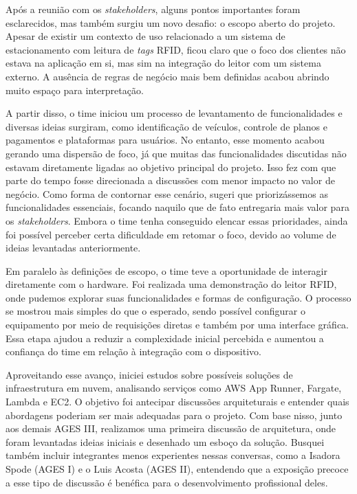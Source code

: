 \indent Após a reunião com os \textit{stakeholders}, alguns pontos importantes foram esclarecidos, mas também surgiu um novo desafio: o escopo aberto do projeto. Apesar de existir um contexto de uso relacionado a um sistema de estacionamento com leitura de \textit{tags} RFID, ficou claro que o foco dos clientes não estava na aplicação em si, mas sim na integração do leitor com um sistema externo. A ausência de regras de negócio mais bem definidas acabou abrindo muito espaço para interpretação.\par

\indent A partir disso, o time iniciou um processo de levantamento de funcionalidades e diversas ideias surgiram, como identificação de veículos, controle de planos e pagamentos e plataformas para usuários. No entanto, esse momento acabou gerando uma dispersão de foco, já que muitas das funcionalidades discutidas não estavam diretamente ligadas ao objetivo principal do projeto. Isso fez com que parte do tempo fosse direcionada a discussões com menor impacto no valor de negócio. Como forma de contornar esse cenário, sugeri que priorizássemos as funcionalidades essenciais, focando naquilo que de fato entregaria mais valor para os \textit{stakeholders}. Embora o time tenha conseguido elencar essas prioridades, ainda foi possível perceber certa dificuldade em retomar o foco, devido ao volume de ideias levantadas anteriormente.\par

\indent Em paralelo às definições de escopo, o time teve a oportunidade de interagir diretamente com o hardware. Foi realizada uma demonstração do leitor RFID, onde pudemos explorar suas funcionalidades e formas de configuração. O processo se mostrou mais simples do que o esperado, sendo possível configurar o equipamento por meio de requisições diretas e também por uma interface gráfica. Essa etapa ajudou a reduzir a complexidade inicial percebida e aumentou a confiança do time em relação à integração com o dispositivo.\par

\indent Aproveitando esse avanço, iniciei estudos sobre possíveis soluções de infraestrutura em nuvem, analisando serviços como AWS App Runner, Fargate, Lambda e EC2. O objetivo foi antecipar discussões arquiteturais e entender quais abordagens poderiam ser mais adequadas para o projeto. Com base nisso, junto aos demais AGES III, realizamos uma primeira discussão de arquitetura, onde foram levantadas ideias iniciais e desenhado um esboço da solução. Busquei também incluir integrantes menos experientes nessas conversas, como a Isadora Spode (AGES I) e o Luis Acosta (AGES II), entendendo que a exposição precoce a esse tipo de discussão é benéfica para o desenvolvimento profissional deles.\par

